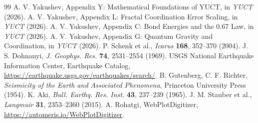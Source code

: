 \documentclass[11pt,a4paper]{article}
\begin{document}
	\begin{thebibliography}{99}
		 A. V. Yakushev, Appendix Y: Mathematical Foundations of YUCT, in \emph{YUCT} (2026).
		 A. V. Yakushev, Appendix L: Fractal Coordination Error Scaling, in \emph{YUCT} (2026).
		 A. V. Yakushev, Appendix C: Bond Energies and the 0.67 Law, in \emph{YUCT} (2026).
		 A. V. Yakushev, Appendix G: Quantum Gravity and Coordination, in \emph{YUCT} (2026).
		 P. Schenk et al., \emph{Icarus} \textbf{168}, 352–370 (2004).
		 J. S. Dohnanyi, \emph{J. Geophys. Res.} \textbf{74}, 2531–2554 (1969).
		 USGS National Earthquake Information Center, Earthquake Catalog, \url{https://earthquake.usgs.gov/earthquakes/search/}.
		 B. Gutenberg, C. F. Richter, \emph{Seismicity of the Earth and Associated Phenomena}, Princeton University Press (1954).
		 K. Aki, \emph{Bull. Earthq. Res. Inst.} \textbf{43}, 237–239 (1965).
		 J. M. Stauber et al., \emph{Langmuir} \textbf{31}, 2353–2360 (2015).
		 A. Rohatgi, WebPlotDigitizer, \url{https://automeris.io/WebPlotDigitizer}.
	\end{thebibliography}
	
\end{document}
